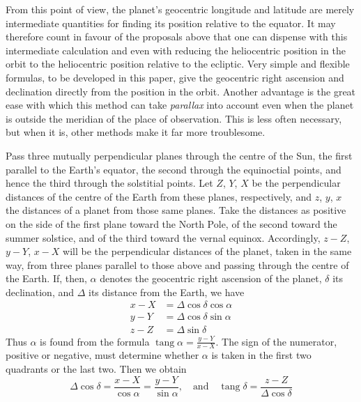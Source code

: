 From this point of view, the planet’s geocentric longitude and latitude are
merely intermediate quantities for finding its position relative to the equator.
It may therefore count in favour of the proposals above that one can dispense
with this intermediate calculation and even with reducing the heliocentric
position in the orbit to the heliocentric position relative to the ecliptic.
Very simple and flexible formulas, to be developed in this paper, give the
geocentric right ascension and declination directly from the position in the
orbit. Another advantage is the great ease with which this method can take
\textit{parallax} into account even when the planet is outside the meridian
of the place of observation. This is less often necessary, but when it is,
other methods make it far more troublesome.

Pass three mutually perpendicular planes through the centre of the Sun,
the first parallel to the Earth’s equator, the second through the equinoctial
points, and hence the third through the solstitial points. Let $Z$, $Y$, $X$
be the perpendicular distances of the centre of the Earth from these planes,
respectively, and $z$, $y$, $x$ the distances of a planet from those same planes.
Take the distances as positive on the side of the first plane toward the North
Pole, of the second toward the summer solstice, and of the third toward the
vernal equinox. Accordingly, $z-Z$, $y-Y$, $x-X$ will be the perpendicular
distances of the planet, taken in the same way, from three planes parallel to
those above and passing through the centre of the Earth. If, then, $\alpha$
denotes the geocentric right ascension of the planet, $\delta$ its declination,
and $\Delta$ its distance from the Earth, we have
\[
\begin{aligned}
x-X&=\Delta\cos\delta\cos\alpha\\
y-Y&=\Delta\cos\delta\sin\alpha\\
z-Z&=\Delta\sin\delta
\end{aligned}
\]
%
Thus $\alpha$ is found from the formula $\operatorname{tang}\alpha=\frac{y-Y}{x-X}$.
The sign of the numerator, positive or negative, must determine whether
$\alpha$ is taken in the first two quadrants or the last two. Then we obtain
\[
\Delta\cos\delta=\frac{x-X}{\cos\alpha}=\frac{y-Y}{\sin\alpha},\quad
\text{and}\quad\operatorname{tang}\delta=\frac{z-Z}{\Delta\cos\delta}
\]

